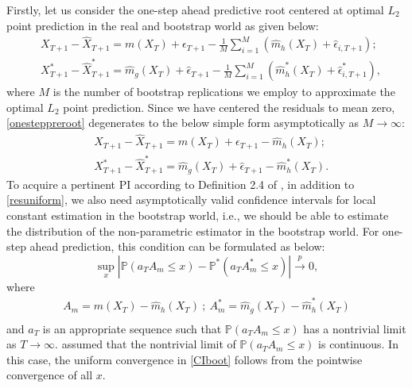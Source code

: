 \documentclass[a4paper]{article}
\newtheorem{Remark}{Remark}[section]
\begin{document}
Firstly, let us consider the one-step ahead predictive root centered at optimal $L_2$ point prediction in the real and bootstrap world as given below:
\begin{equation}\label{onesteppreroot}
\begin{split}
     &X_{T+1} - \widehat{X}_{T+1} = m(X_T)+\epsilon_{T+1} - \frac{1}{M}\sum_{i=1}^{M}\left(\widehat{m}_{h}(X_T) + \hat{\epsilon}_{i,T+1}\right); \\
     &X^*_{T+1} - \widehat{X}^*_{T+1} = \widehat{m}_{g}(X_T)+\hat{\epsilon}_{T+1}  - \frac{1}{M}\sum_{i=1}^{M}\left(\widehat{m}^*_{h}(X_T) + \hat{\epsilon}^*_{i,T+1}\right),
\end{split}
\end{equation}
where $M$ is the number of bootstrap replications we employ to approximate the optimal $L_2$ point prediction. Since we have centered the residuals to   mean zero, \cref{onesteppreroot} degenerates to the below simple form asymptotically as $M\to \infty$:
\begin{equation}\label{onestepprerootsimp}
\begin{split}
     &X_{T+1} - \widehat{X}_{T+1} = m(X_T)+\epsilon_{T+1} - \widehat{m}_{h}(X_T); \\
     &X^*_{T+1} - \widehat{X}^*_{T+1} = \widehat{m}_{g}(X_T)+\hat{\epsilon}_{T+1}  - \widehat{m}^*_{h}(X_T).
\end{split}
\end{equation}
To acquire a pertinent PI according to Definition 2.4 of \cite{pan2016bootstrap}, in addition to \cref{resuniform}, we also need asymptotically valid confidence intervals for local constant estimation in the bootstrap world, i.e., we 
should be able to estimate the distribution of the non-parametric estimator in the bootstrap world. For one-step ahead prediction, this condition can be formulated as below:
\begin{equation}\label{CIboot}
    \sup_{x}|\mathbb{P}(a_TA_{m}\leq x) - \mathbb{P}^{*}(a_TA^*_{m}\leq x)|\overset{p}{\to} 0,
\end{equation}
where 
\begin{equation}
\begin{split}
A_{m} = m(X_T) - \widehat{m}_h(X_T)~;~A^*_{m} = \widehat{m}_g(X_T) -  \widehat{m}^*_h(X_T)  \\
\end{split}
\end{equation}
\noindent 
and $a_T$ is an   appropriate sequence such that
$\mathbb{P}(a_TA_{m}\leq x)$ has a nontrivial limit 
as $T\to \infty$.   
\cite{pan2016bootstrap} assumed that the nontrivial limit of $\mathbb{P}(a_TA_{m}\leq x)$ is continuous. In this case,  the uniform convergence in \cref{CIboot} follows from the pointwise convergence of all $x$. 
\end{document}
